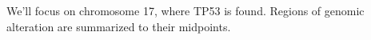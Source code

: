 
We'll focus on chromosome 17, where TP53 is found. Regions
of genomic alteration are summarized to their midpoints.


